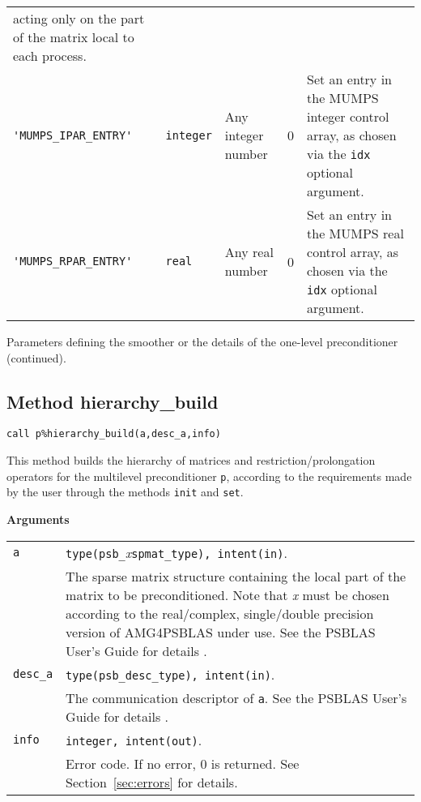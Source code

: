 \begin{center}
\begin{tabular}{|p{3cm}|l|p{2.5cm}|p{2.2cm}|p{7.1cm}|}
                           acting only on the part of the matrix local
                           to each process. \\ %
\verb|'MUMPS_IPAR_ENTRY'|  & \verb|integer|
                         & Any integer  number
                         & 0
                         & Set an entry in the MUMPS integer control array, as
                           chosen via the \verb|idx| optional argument. \\ %
\verb|'MUMPS_RPAR_ENTRY'|  & \verb|real|
                         & Any real number
                         & 0
                         & Set an entry in the MUMPS real control array, as
                           chosen via the \verb|idx| optional argument. \\ %
\hline
\end{tabular}
\end{center}
\caption{Parameters defining the smoother or the details of the one-level preconditioner
(continued).\label{tab:p_smoother_1}}
\esideways


\clearpage

\subsection{Method hierarchy\_build\label{sec:hier_bld}}

\begin{center}
\verb|call p%hierarchy_build(a,desc_a,info)|\\
\end{center}

\noindent
This method builds the hierarchy of matrices and restriction/prolongation
operators for the multilevel preconditioner \verb|p|, according to the requirements
made by the user through the methods \verb|init| and \verb|set|.

{\baselineskip\noindent\large\bfseries Arguments} \smallskip

\begin{tabular}{p{1.2cm}p{12cm}}
\verb|a|      & \verb|type(psb_|\emph{x}\verb|spmat_type), intent(in)|. \\
              & The sparse matrix structure containing the local part of the
                matrix to be preconditioned. Note that \emph{x} must be chosen according
                to the real/complex,
single/double precision version of AMG4PSBLAS under use.
                See the PSBLAS User's Guide for details \cite{PSBLASGUIDE}.\\
\verb|desc_a| & \verb|type(psb_desc_type), intent(in)|. \\
              & The communication descriptor of \verb|a|. See the PSBLAS User's Guide for
                details \cite{PSBLASGUIDE}.\\

\verb|info|   & \verb|integer, intent(out)|.\\
              & Error code. If no error, 0 is returned. See Section~\ref{sec:errors} for details.\\
\end{tabular}


